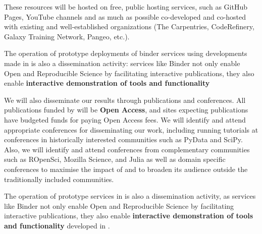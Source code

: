 These resources will be hosted on free, public hosting services,
such as GitHub Pages, YouTube channels and as much as possible co-developed and co-hosted with existing and
well-established organizations
(The Carpentries, CodeRefinery, Galaxy Training Network, Pangeo, etc.).


The operation of prototype deployments of binder services
using developments made in  is also a dissemination activity: services like Binder not only
enable Open and Reproducible Science by
facilitating interactive publications, they also enable \textbf{interactive demonstration of tools and functionality}

We will also disseminate our results through publications and conferences.
All publications funded by \TheProject will be \textbf{Open Access},
and sites expecting publications have budgeted funds for paying Open Access fees.
We will identify and attend appropriate conferences for disseminating our work,
including running tutorials at conferences in historically interested communities such as PyData and SciPy.
Also, we will identify and attend conferences from complementary communities such as ROpenSci,
Mozilla Science, and Julia
as well as domain specific conferences to maximise the impact of \TheProject and to broaden its
audience outside the
traditionally included communities.

The operation of prototype services in  is also a dissemination activity,
as services like Binder not only enable Open and Reproducible Science by facilitating interactive publications,
they also enable \textbf{interactive demonstration of tools and functionality}
developed in \TheProject.

